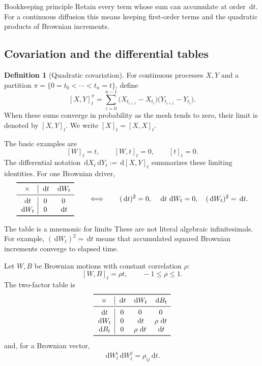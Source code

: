 \documentclass[10pt]{article}
\newcommand{\1}{\mathbf 1}
\newcommand{\dd}{\,\mathrm d}
\theoremstyle{definition}
\newtheorem{definition}{Definition}[section]
\begin{document}
\begin{keyidea}{Bookkeeping principle}
Retain every term whose sum can accumulate at order \(\dd t\). For a continuous
diffusion this means keeping first-order terms and the quadratic products of
Brownian increments.
\end{keyidea}

\subsection{Covariation and the differential tables}

\begin{definition}[Quadratic covariation]
For continuous processes \(X,Y\) and a partition
\(\pi=\{0=t_0<\cdots<t_n=t\}\), define
\[
[X,Y]_t^\pi
=\sum_{i=0}^{n-1}
\bigl(X_{t_{i+1}}-X_{t_i}\bigr)
\bigl(Y_{t_{i+1}}-Y_{t_i}\bigr).
\]
When these sums converge in probability as the mesh tends to zero, their
limit is denoted by \([X,Y]_t\). We write \([X]_t=[X,X]_t\).
\end{definition}

The basic examples are
\[
[W]_t=t,\qquad [W,t]_t=0,\qquad [t]_t=0.
\]
The differential notation
\(\dd X_t\dd Y_t:=\dd[X,Y]_t\) summarizes these limiting identities.
For one Brownian driver,
\[
\begin{array}{c|cc}
\toprule
\times & \dd t & \dd W_t\\
\midrule
\dd t & 0 & 0\\
\dd W_t & 0 & \dd t\\
\bottomrule
\end{array}
\qquad\Longleftrightarrow\qquad
(\dd t)^2=0,\quad
\dd t\,\dd W_t=0,\quad
(\dd W_t)^2=\dd t.
\]

\begin{warningbox}{The table is a mnemonic for limits}
These are not literal algebraic infinitesimals. For example,
\((\dd W_t)^2=\dd t\) means that accumulated squared Brownian increments
converge to elapsed time.
\end{warningbox}

Let \(W,B\) be Brownian motions with constant correlation \(\rho\):
\[
[W,B]_t=\rho t,\qquad -1\leq\rho\leq1.
\]
The two-factor table is
\[
\begin{array}{c|ccc}
\toprule
\times & \dd t & \dd W_t & \dd B_t\\
\midrule
\dd t & 0 & 0 & 0\\
\dd W_t & 0 & \dd t & \rho\,\dd t\\
\dd B_t & 0 & \rho\,\dd t & \dd t\\
\bottomrule
\end{array}
\]
and, for a Brownian vector,
\[
\dd W_t^i\dd W_t^j=\rho_{ij}\dd t.
\]
\end{document}
